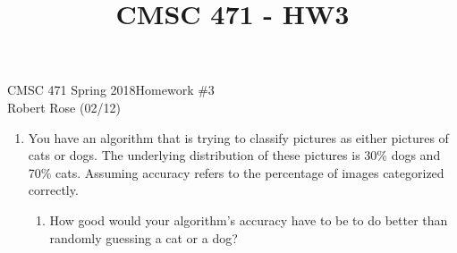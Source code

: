 \documentclass[12pt]{article}
\title{CMSC 471 - HW3}
\begin{document}
CMSC 471 Spring 2018\hfill Homework \#3\\
Robert Rose (02/12)

\hrulefill

\begin{enumerate}
\item You have an algorithm that is trying to classify pictures as either pictures of cats or dogs. The underlying distribution of these pictures is 30\% dogs and 70\% cats. Assuming accuracy refers to the percentage of images categorized correctly.
  \begin{enumerate}
  \item How good would your algorithm's accuracy have to be to do better than randomly guessing a cat or a dog?

  \end{enumerate}
\newpage

\end{enumerate}
\end{document}
